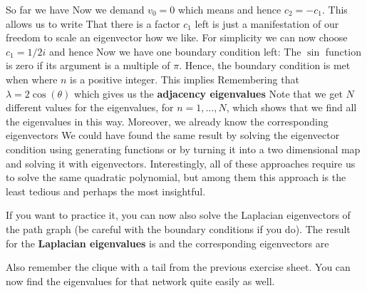 \solution 
So far we have
Now we demand $v_0=0$ which means 
and hence $c_2=-c_1$. This allows us to write 
That there is a factor $c_1$ left is just a manifestation of our freedom to scale an eigenvector how we like. For simplicity we can now choose $c_1=1/2i$ and hence 
Now we have one boundary condition left: 
The $\sin$ function is zero if its argument is a multiple of $\pi$. Hence, the boundary condition is met when 
where $n$ is a positive integer. This implies 
Remembering that $\lambda = 2 \cos(\theta)$ which gives us the {\bf adjacency eigenvalues} 
Note that we get $N$ different values for the eigenvalues, for $n=1,\ldots,N$, which shows that we find all the eigenvalues in this way. Moreover, we already know the corresponding eigenvectors 
We could have found the same result by solving the eigenvector condition using generating functions or by turning it into a two dimensional map and solving it with eigenvectors. Interestingly, all of these approaches require us to solve the same quadratic polynomial, but among them this approach is the least tedious and perhaps the most insightful. 

If you want to practice it, you can now also solve the Laplacian eigenvectors of the path graph (be careful with the boundary conditions if you do). The result for the {\bf Laplacian eigenvalues} is 
and the corresponding eigenvectors are 

Also remember the clique with a tail from the previous exercise sheet. You can now find the eigenvalues for that network quite easily as well. 

